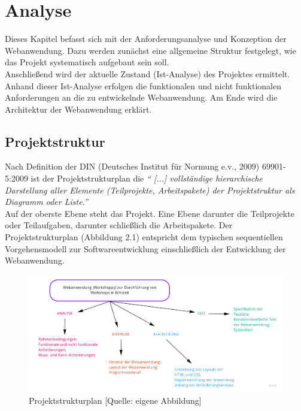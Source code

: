\chapter{Analyse}
\label{sec:analyse}
Dieses Kapitel befasst sich mit der Anforderungsanalyse und Konzeption der Webanwendung. Dazu werden zunächst eine allgemeine Struktur festgelegt, wie das Projekt systematisch aufgebaut sein soll.
\\

Anschließend wird der aktuelle Zustand (Ist-Analyse) des Projektes ermittelt. Anhand dieser Ist-Analyse erfolgen die funktionalen und nicht funktionalen Anforderungen an die zu entwickelnde Webanwendung. Am Ende wird die Architektur der Webanwendung erklärt.


\section{Projektstruktur}
\label{sec:projektstruktur}
Nach Definition der DIN (Deutsches Institut für Normung e.v., 2009) 69901-5:2009 ist der Projektstrukturplan die \textit{“ [...] vollständige hierarchische Darstellung aller Elemente (Teilprojekte, Arbeitspakete) der Projektstruktur als Diagramm oder Liste.”}
\\

Auf der oberste Ebene steht das Projekt. Eine Ebene darunter die Teilprojekte oder Teilaufgaben, darunter schließlich die Arbeitspakete. 
Der Projektstrukturplan (Abbildung 2.1) entspricht dem typischen sequentiellen Vorgehensmodell zur Softwareentwicklung einschließlich der Entwicklung der Webanwendung.

\begin{figure}[H]
  \centering  
  \includegraphics[scale=0.3]{img/Projektstrukturplan.jpg}
  \caption{Projektstrukturplan [Quelle: eigene Abbildung]}
  \label{fig:projektstrukturplan}
\end{figure}

